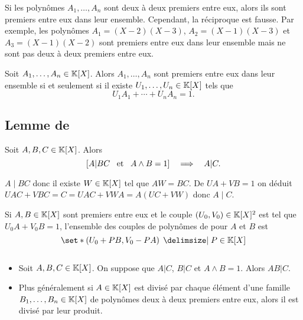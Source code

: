 \documentclass{magnolia}
\begin{document}
\begin{remarqueUnique}
\remarque Si les polynômes $A_1,\ldots,A_n$ sont deux à deux premiers entre eux, alors
  ils sont premiers entre eux dans leur ensemble. Cependant, la réciproque est fausse.
  Par exemple, les polynômes $A_1=(X-2)(X-3)$, $A_2=(X-1)(X-3)$ et $A_3=(X-1)(X-2)$
  sont premiers entre eux dans leur ensemble mais ne sont pas deux à deux premiers
  entre eux.
\end{remarqueUnique}


\begin{proposition}
Soit $A_1,\ldots,A_n\in\polyK$. Alors $A_1,\ldots,A_n$ sont premiers entre eux dans leur
ensemble si et seulement si il existe $U_1,\ldots,U_n\in\polyK$ tels que
\[U_1 A_1+\cdots+U_n A_n=1.\]
\end{proposition}


\subsection{Lemme de }

\begin{proposition}[nom={Lemme de \nom{Gauss}}]
Soit $A,B,C\in\polyK$. Alors
\[\left[A|BC \quad\!\text{et}\quad\! A\wedge B=1\right]\quad\Longrightarrow\quad A|C.\]  
\end{proposition}

\begin{preuve}
$A\mid BC$ donc il existe $W \in \polyK$ tel que $AW=BC$. De $UA+VB=1$ on déduit $UAC+VBC=C=UAC+VWA=A(UC+VW)$ donc $A\mid C$.
\end{preuve}


\begin{remarqueUnique}
\exo Si $A,B\in\polyK$ sont premiers entre eux et le couple
  $\p{U_0,V_0}\in\polyK^2$ est tel que $U_0A+V_0B=1$, l'ensemble des couples de
  polynômes de  pour $A$ et $B$ est
  \[\enstq{\p{U_0+PB,V_0-PA}}{P\in\polyK}\]
\end{remarqueUnique}

\begin{proposition}
$\quad$
\begin{itemize}
\item Soit $A,B,C\in\polyK$. On suppose que $A|C$, $B|C$ et $A\wedge B=1$.
  Alors $AB|C$.
\item Plus généralement si $A\in\polyK$ est divisé par chaque élément d'une
  famille $B_1,\ldots,B_n\in\polyK$ de polynômes deux à deux premiers entre eux,
  alors il est divisé par leur produit.
\end{itemize}
\end{proposition}
\end{document}
